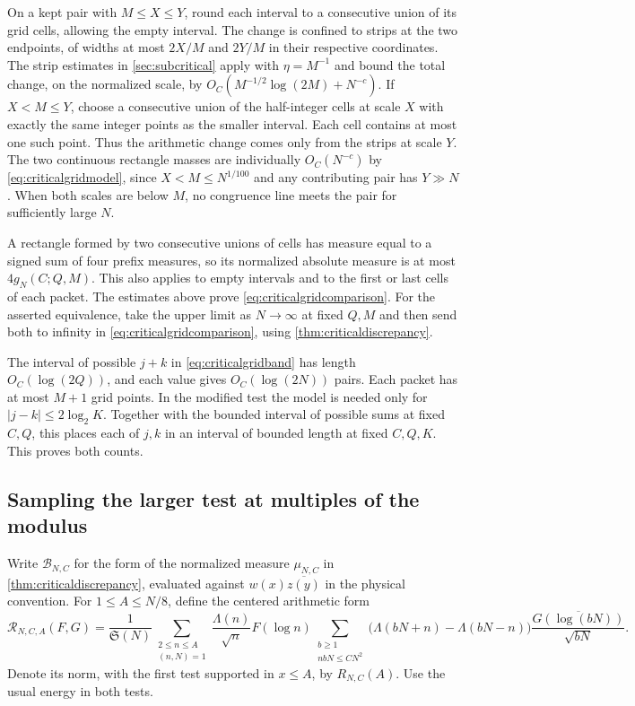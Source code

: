 \documentclass[11pt,a4paper]{article}
\numberwithin{equation}{section}
\newcommand{\SSS}{\mathfrak S}
\begin{document}
On a kept pair with $M\le X\le Y$, round each interval
to a consecutive union of its grid cells, allowing the
empty interval. The change is confined to strips at
the two endpoints, of widths at most $2X/M$ and $2Y/M$
in their respective coordinates. The strip estimates in
\cref{sec:subcritical} apply with $\eta=M^{-1}$ and bound
the total change, on the normalized scale, by
$O_C(M^{-1/2}\log(2M)+N^{-c})$.
If $X<M\le Y$, choose a consecutive union of the
half-integer cells at scale $X$ with exactly the same
integer points as the smaller interval. Each cell contains
at most one such point. Thus the arithmetic change comes
only from the strips at scale $Y$. The two continuous
rectangle masses are individually $O_C(N^{-c})$ by
\cref{eq:criticalgridmodel}, since $X<M\le N^{1/100}$
and any contributing pair has $Y\gg N$. When both scales
are below $M$, no congruence line meets the pair for
sufficiently large $N$.

A rectangle formed by two consecutive unions of cells
has measure equal to a signed sum of four prefix
measures, so its normalized absolute measure is at
most $4g_N(C;Q,M)$. This also applies to empty intervals
and to the first or last cells of each packet. The
estimates above prove \cref{eq:criticalgridcomparison}.
For the asserted equivalence, take the upper limit as
$N\to\infty$ at fixed $Q,M$ and then send both to infinity
in \cref{eq:criticalgridcomparison}, using
\cref{thm:criticaldiscrepancy}.

The interval of possible $j+k$ in
\cref{eq:criticalgridband} has length $O_C(\log(2Q))$,
and each value gives $O_C(\log(2N))$ pairs. Each packet
has at most $M+1$ grid points. In the modified test
the model is needed only for $|j-k|\le 2\log_2 K$.
Together with the bounded interval of possible sums
at fixed $C,Q$, this places each of $j,k$ in an
interval of bounded length at fixed $C,Q,K$.
This proves both counts.

\subsection{Sampling the larger test at multiples of the modulus}

Write $\mathcal B_{N,C}$ for the form of the normalized measure
$\mu_{N,C}$ in \cref{thm:criticaldiscrepancy}, evaluated against
$w(x)\overline{z(y)}$ in the physical convention.
For $1\le A\le N/8$, define the centered arithmetic form
\begin{equation}
 \mathcal R_{N,C,A}(F,G)=\frac{1}{\SSS(N)}
 \sum_{\substack{2\le n\le A\\(n,N)=1}}\frac{\Lambda(n)}{\sqrt n}
      F(\log n)\!
 \sum_{\substack{b\ge1\\ n bN\le CN^2}}
   \bigl(\Lambda(bN+n)-\Lambda(bN-n)\bigr)
      \frac{\overline{G(\log(bN))}}{\sqrt{bN}} .
 \label{eq:criticalcenteredform}
\end{equation}
Denote its norm, with the first test supported in $x\le A$,
by $R_{N,C}(A)$. Use the usual energy in both tests.
\end{document}
